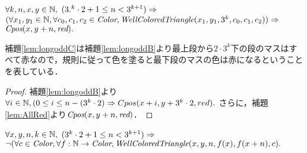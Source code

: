 \begin{lem}[\LongOddC] \label{lem:longoddC}
  $\forall k,n,x,y \in \mathbb{N},$
  $(3.^k\cdot2 + 1 \leq n < 3^{k+1}) \Rightarrow$
  $(\forall x_1,y_1 \in \mathbb{N}, \forall c_0,c_1,c_2 \in \textit{Color}, \textit{WellColoredTriangle}(x_1,y_1,3^k,c_0,c_1,c_2)) \Rightarrow$
  $\textit{Cpos}(x,y+n,\textit{red}).$
\end{lem}
補題\ref{lem:longoddC}は補題\ref{lem:longoddB}より最上段から$2\cdot3^k$下の段のマスはすべて赤なので，規則に従って色を塗ると最下段のマスの色は赤になるということを表している．
\begin{proof}
  補題\ref{lem:longoddB}より$\forall i \in \mathbb{N}, (0 \leq i \leq n-(3^k\cdot2) \Rightarrow Cpos(x+i,y+3^k\cdot2,red).$
  さらに，補題\ref{lem:AllRed}より$\textit{Cpos}(x,y+n,\textit{red})$．
\end{proof}
\begin{lem}[\LongOdd] \label{lem:longodd}
  $\forall x,y,n,k \in \mathbb{N},$
  $(3^k\cdot2 + 1 \leq n < 3^{k+1}) \Rightarrow$
  $\lnot(\forall c \in \textit{Color}, \forall f:\mathbb{N} \to \textit{Color}, \textit{WellColoredTriangle}(x,y,n,f(x),f(x+n), c).$
\end{lem}
